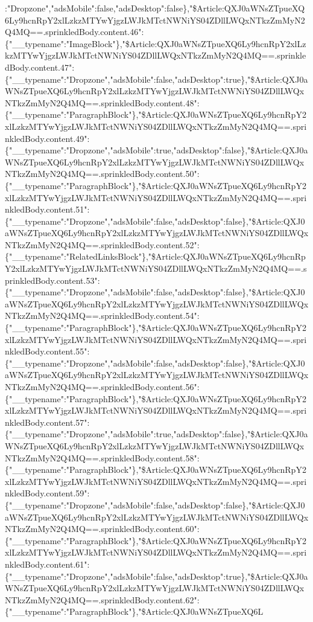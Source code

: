 :"Dropzone","adsMobile":false,"adsDesktop":false\},"\$Article:QXJ0aWNsZTpueXQ6Ly9hcnRpY2xlLzkzMTYwYjgzLWJkMTctNWNiYS04ZDllLWQxNTkzZmMyN2Q4MQ==.sprinkledBody.content.46":\{"\_\_typename":"ImageBlock"\},"\$Article:QXJ0aWNsZTpueXQ6Ly9hcnRpY2xlLzkzMTYwYjgzLWJkMTctNWNiYS04ZDllLWQxNTkzZmMyN2Q4MQ==.sprinkledBody.content.47":\{"\_\_typename":"Dropzone","adsMobile":false,"adsDesktop":true\},"\$Article:QXJ0aWNsZTpueXQ6Ly9hcnRpY2xlLzkzMTYwYjgzLWJkMTctNWNiYS04ZDllLWQxNTkzZmMyN2Q4MQ==.sprinkledBody.content.48":\{"\_\_typename":"ParagraphBlock"\},"\$Article:QXJ0aWNsZTpueXQ6Ly9hcnRpY2xlLzkzMTYwYjgzLWJkMTctNWNiYS04ZDllLWQxNTkzZmMyN2Q4MQ==.sprinkledBody.content.49":\{"\_\_typename":"Dropzone","adsMobile":true,"adsDesktop":false\},"\$Article:QXJ0aWNsZTpueXQ6Ly9hcnRpY2xlLzkzMTYwYjgzLWJkMTctNWNiYS04ZDllLWQxNTkzZmMyN2Q4MQ==.sprinkledBody.content.50":\{"\_\_typename":"ParagraphBlock"\},"\$Article:QXJ0aWNsZTpueXQ6Ly9hcnRpY2xlLzkzMTYwYjgzLWJkMTctNWNiYS04ZDllLWQxNTkzZmMyN2Q4MQ==.sprinkledBody.content.51":\{"\_\_typename":"Dropzone","adsMobile":false,"adsDesktop":false\},"\$Article:QXJ0aWNsZTpueXQ6Ly9hcnRpY2xlLzkzMTYwYjgzLWJkMTctNWNiYS04ZDllLWQxNTkzZmMyN2Q4MQ==.sprinkledBody.content.52":\{"\_\_typename":"RelatedLinksBlock"\},"\$Article:QXJ0aWNsZTpueXQ6Ly9hcnRpY2xlLzkzMTYwYjgzLWJkMTctNWNiYS04ZDllLWQxNTkzZmMyN2Q4MQ==.sprinkledBody.content.53":\{"\_\_typename":"Dropzone","adsMobile":false,"adsDesktop":false\},"\$Article:QXJ0aWNsZTpueXQ6Ly9hcnRpY2xlLzkzMTYwYjgzLWJkMTctNWNiYS04ZDllLWQxNTkzZmMyN2Q4MQ==.sprinkledBody.content.54":\{"\_\_typename":"ParagraphBlock"\},"\$Article:QXJ0aWNsZTpueXQ6Ly9hcnRpY2xlLzkzMTYwYjgzLWJkMTctNWNiYS04ZDllLWQxNTkzZmMyN2Q4MQ==.sprinkledBody.content.55":\{"\_\_typename":"Dropzone","adsMobile":false,"adsDesktop":false\},"\$Article:QXJ0aWNsZTpueXQ6Ly9hcnRpY2xlLzkzMTYwYjgzLWJkMTctNWNiYS04ZDllLWQxNTkzZmMyN2Q4MQ==.sprinkledBody.content.56":\{"\_\_typename":"ParagraphBlock"\},"\$Article:QXJ0aWNsZTpueXQ6Ly9hcnRpY2xlLzkzMTYwYjgzLWJkMTctNWNiYS04ZDllLWQxNTkzZmMyN2Q4MQ==.sprinkledBody.content.57":\{"\_\_typename":"Dropzone","adsMobile":true,"adsDesktop":false\},"\$Article:QXJ0aWNsZTpueXQ6Ly9hcnRpY2xlLzkzMTYwYjgzLWJkMTctNWNiYS04ZDllLWQxNTkzZmMyN2Q4MQ==.sprinkledBody.content.58":\{"\_\_typename":"ParagraphBlock"\},"\$Article:QXJ0aWNsZTpueXQ6Ly9hcnRpY2xlLzkzMTYwYjgzLWJkMTctNWNiYS04ZDllLWQxNTkzZmMyN2Q4MQ==.sprinkledBody.content.59":\{"\_\_typename":"Dropzone","adsMobile":false,"adsDesktop":false\},"\$Article:QXJ0aWNsZTpueXQ6Ly9hcnRpY2xlLzkzMTYwYjgzLWJkMTctNWNiYS04ZDllLWQxNTkzZmMyN2Q4MQ==.sprinkledBody.content.60":\{"\_\_typename":"ParagraphBlock"\},"\$Article:QXJ0aWNsZTpueXQ6Ly9hcnRpY2xlLzkzMTYwYjgzLWJkMTctNWNiYS04ZDllLWQxNTkzZmMyN2Q4MQ==.sprinkledBody.content.61":\{"\_\_typename":"Dropzone","adsMobile":false,"adsDesktop":true\},"\$Article:QXJ0aWNsZTpueXQ6Ly9hcnRpY2xlLzkzMTYwYjgzLWJkMTctNWNiYS04ZDllLWQxNTkzZmMyN2Q4MQ==.sprinkledBody.content.62":\{"\_\_typename":"ParagraphBlock"\},"\$Article:QXJ0aWNsZTpueXQ6L
